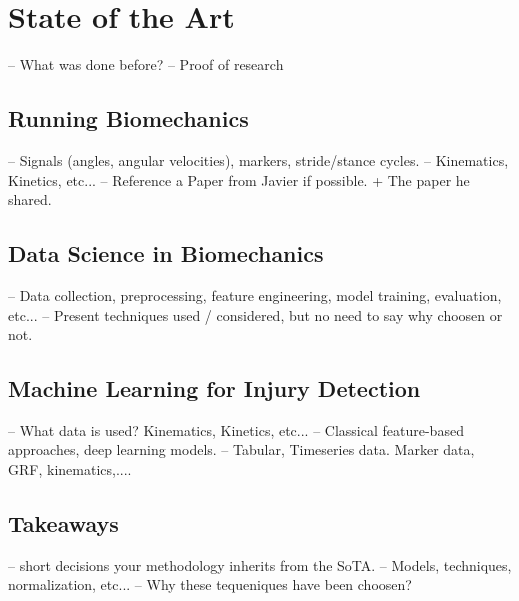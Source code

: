\chapter{State of the Art}\label{chap:state-of-the-art}
-- What was done before?
-- Proof of research

\section{Running Biomechanics}\label{sec:sota-biomechanics}
-- Signals (angles, angular velocities), markers, stride/stance cycles.
-- Kinematics, Kinetics, etc...
-- Reference a Paper from Javier if possible. + The paper he shared.

\section{Data Science in Biomechanics}\label{sec:sota-data-science}
-- Data collection, preprocessing, feature engineering, model training, evaluation, etc...
-- Present techniques used / considered, but no need to say why choosen or not.

\section{Machine Learning for Injury Detection}\label{sec:sota-ml-injury-detection}
-- What data is used? Kinematics, Kinetics, etc...
-- Classical feature-based approaches, deep learning models.
-- Tabular, Timeseries data. Marker data, GRF, kinematics,....


\section{Takeaways}\label{sec:sota-methodological-takeaways}
-- short decisions your methodology inherits from the SoTA.
-- Models, techniques, normalization, etc...
-- Why these tequeniques have been choosen?
